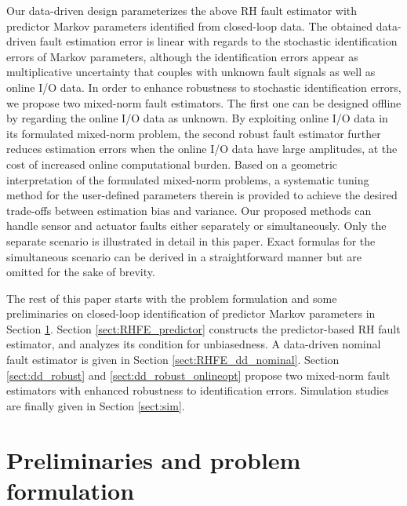 \documentclass[twocolumn]{autart}
\begin{document}
Our data-driven design parameterizes the above RH fault estimator with predictor Markov parameters identified from closed-loop data. The obtained data-driven fault estimation error is linear with regards to the stochastic identification errors of Markov parameters, although the identification errors appear as multiplicative uncertainty that couples with unknown fault signals as well as online I/O data. In order to enhance robustness to  stochastic identification errors, we propose two mixed-norm fault estimators.
The first one can be designed offline by regarding the online I/O data as unknown. By exploiting online I/O data in its formulated mixed-norm problem, the second robust fault estimator further reduces estimation errors when the online I/O data have large amplitudes, at the cost of increased online computational burden.  Based on a geometric interpretation of the formulated mixed-norm problems, a systematic tuning method for the user-defined parameters therein is provided to achieve the desired trade-offs between estimation bias and variance. 
Our proposed methods can handle sensor and actuator faults either separately or simultaneously. Only the separate scenario is illustrated in detail in this paper. Exact formulas for the simultaneous scenario can be derived in a straightforward manner but are omitted for the sake of brevity.


The rest of this paper starts with the problem formulation and some preliminaries on closed-loop identification of predictor Markov parameters in Section \ref{sect:probformulation}. Section \ref{sect:RHFE_predictor} constructs the predictor-based RH fault estimator, and analyzes its condition for unbiasedness. A data-driven nominal fault estimator is given in Section \ref{sect:RHFE_dd_nominal}. Section \ref{sect:dd_robust} and \ref{sect:dd_robust_onlineopt} propose two mixed-norm fault estimators with enhanced robustness to identification errors. Simulation studies are finally given in Section \ref{sect:sim}.

\section{Preliminaries and problem formulation}\label{sect:probformulation}
\end{document}
